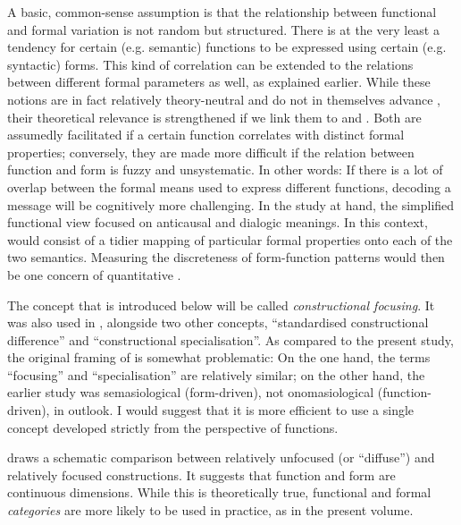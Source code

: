 A basic, common-sense assumption is that the relationship between functional and formal variation is not random but structured. There is at the very least a tendency for certain (e.g. semantic) functions to be expressed using certain (e.g. syntactic) forms. This kind of correlation can be extended to the relations between different formal parameters as well, as explained earlier. While these notions are in fact relatively theory-neutral and do not in themselves advance , their theoretical relevance is strengthened if we link them to  and . Both are assumedly facilitated if a certain function correlates with distinct formal properties; conversely, they are made more difficult if the relation between function and form is fuzzy and unsystematic. In other words: If there is a lot of overlap between the formal means used to express different functions, decoding a message will be cognitively more challenging. In the study at hand, the simplified functional view focused on anticausal and dialogic meanings. In this context,  would consist of a tidier mapping of particular formal properties onto each of the two semantics. Measuring the discreteness of form-function patterns would then be one concern of quantitative .

The concept that is introduced below will be called \textit{constructional focusing}. It was also used in \citet[124–128]{Schützler2018c}, alongside two other concepts, “standardised constructional difference” and “constructional specialisation”. As compared to the present study, the original framing of  is somewhat problematic: On the one hand, the terms “focusing” and “specialisation” are relatively similar; on the other hand, the earlier study was semasiological (form-driven), not onomasiological (function-driven), in outlook. I would suggest that it is more efficient to use a single concept developed strictly from the perspective of functions.

 draws a schematic comparison between relatively unfocused (or “diffuse”) and relatively focused constructions. It suggests that function and form are continuous dimensions. While this is theoretically true, functional and formal \textit{categories} are more likely to be used in practice, as in the present volume.

